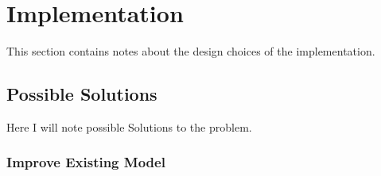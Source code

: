 \section{Implementation}

This section contains notes about the design choices of the implementation.









\subsection{Possible Solutions}

Here I will note possible Solutions to the problem.

\subsubsection{Improve Existing Model}

